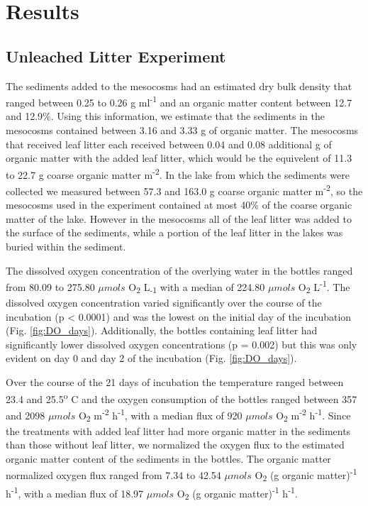 \section{Results}
\subsection{Unleached Litter Experiment}
The sediments added to the mesocosms had an estimated dry bulk density that ranged between 0.25 to 0.26 g ml\textsuperscript{-1} and an organic matter content between 12.7 and 12.9\%. Using this information, we estimate that the sediments in the mesocosms contained between 3.16 and 3.33 g of organic matter.  The mesocosms that received leaf litter each received between 0.04 and 0.08 additional g of organic matter with the added leaf litter, which would be the equivelent of 11.3 to 22.7 g coarse organic matter m\textsuperscript{-2}. In the lake from which the sediments were collected we measured between 57.3 and 163.0 g coarse organic matter m\textsuperscript{-2}, so the mesocosms used in the experiment contained at most 40\% of the coarse organic matter of the lake. However in the mesocosms all of the leaf litter was added to the surface of the sediments, while a portion of the leaf litter in the lakes was buried within the sediment.

The dissolved oxygen concentration of the overlying water in the bottles ranged from 80.09 to 275.80 $\mu mols$ O\textsubscript{2} L\textsubscript{-1} with a median of 224.80 $\mu mols$ O\textsubscript{2} L\textsuperscript{-1}.  The dissolved oxygen concentration varied significantly over the course of the incubation (p < 0.0001) and was the lowest on the initial day of the incubation (Fig. \ref{fig:DO_days}). Additionally, the bottles containing leaf litter had significantly lower dissolved oxygen concentrations (p = 0.002) but this was only evident on day 0 and day 2 of the incubation (Fig. \ref{fig:DO_days}).

Over the course of the 21 days of incubation the temperature ranged between 23.4 and 25.5\textsuperscript{o} C and the oxygen consumption of the bottles ranged between 357 and 2098 $\mu mols$ O\textsubscript{2} m\textsuperscript{-2} h\textsuperscript{-1}, with a median flux of 920 $\mu mols$ O\textsubscript{2} m\textsuperscript{-2} h\textsuperscript{-1}. Since the treatments with added leaf litter had more organic matter in the sediments than those without leaf litter, we normalized the oxygen flux to the estimated organic matter content of the sediments in the bottles. The organic matter normalized oxygen flux ranged from 7.34 to 42.54 $\mu mols$ O\textsubscript{2} (g organic matter)\textsuperscript{-1} h\textsuperscript{-1}, with a median flux of 18.97 $\mu mols$ O\textsubscript{2} (g organic matter)\textsuperscript{-1} h\textsuperscript{-1}.

